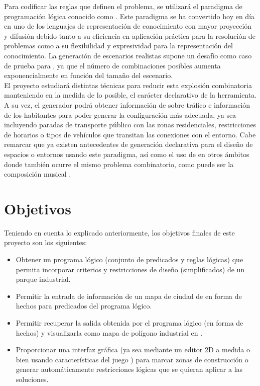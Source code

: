 Para codificar las reglas que definen el problema, se utilizará el paradigma de programación lógica conocido como \asp \cite{asp}. Este paradigma se ha convertido hoy en día en uno de los lenguajes de representación de conocimiento con mayor proyección y difusión debido tanto a su eficiencia en aplicación práctica para la resolución de problemas como a su flexibilidad y expresividad para la representación del conocimiento. La generación de escenarios realistas \cite{5783900} supone un desafío como caso de prueba para \asp, ya que el número de combinaciones posibles aumenta exponencialmente en función del tamaño del escenario. \\

El proyecto estudiará distintas técnicas para reducir esta explosión combinatoria manteniendo en la medida de lo posible, el carácter declarativo de la herramienta. A su vez, el generador podrá obtener información de \cities sobre tráfico e información de los habitantes para poder generar la configuración más adecuada, ya sea incluyendo paradas de transporte público con las zonas residenciales, restricciones de horarios o tipos de vehículos que transitan las conexiones con el entorno. Cabe remarcar que ya existen antecedentes de generación declarativa para el diseño de espacios o entornos \cite{freeciv-editor} \cite{desing} usando este paradigma, así como el uso de \asp en otros ámbitos donde también ocurre el mismo problema combinatorio, como puede ser la composición musical \cite{haspie}\cite{DBLP:journals/corr/abs-1006-4948}.

\section{Objetivos}

Teniendo en cuenta lo explicado anteriormente, los objetivos finales de este proyecto son los siguientes:

\begin{itemize}
	\item Obtener un programa lógico (conjunto de predicados y reglas lógicas) que permita incorporar criterios y restricciones de diseño (simplificados) de un parque industrial.
	\item Permitir la entrada de información de un mapa de ciudad de \cities en forma de hechos para predicados del programa lógico.
	\item Permitir recuperar la salida obtenida por el programa lógico (en forma de hechos) y visualizarla como mapa de polígono industrial en \cities.
	\item Proporcionar una interfaz gráfica (ya sea mediante un editor 2D a medida o bien usando características del juego \cities) para marcar zonas de construcción o generar automáticamente restricciones lógicas que se quieran aplicar a las soluciones.
\end{itemize}

